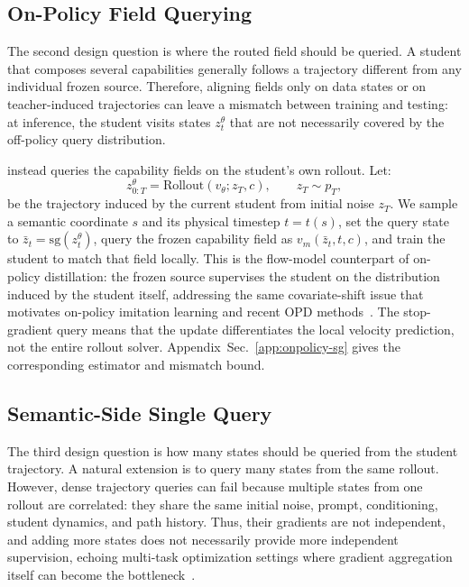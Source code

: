 \subsection{On-Policy Field Querying}
\label{sec:onpolicy-query}

The second design question is where the routed field should be queried. A student that composes several capabilities generally follows a trajectory different from any individual frozen source. Therefore, aligning fields only on data states or on teacher-induced trajectories can leave a mismatch between training and testing: at inference, the student visits states $z_t^\theta$ that are not necessarily covered by the off-policy query distribution.

\name{} instead queries the capability fields on the student's own rollout. Let:
\begin{equation}
  z_{0:T}^{\theta}=\mathrm{Rollout}(v_\theta; z_T,c), \qquad z_T\sim p_T,
  \label{eq:student-rollout}
\end{equation}
be the trajectory induced by the current student from initial noise $z_T$. We sample a semantic coordinate $s$ and its physical timestep $t=t(s)$, set the query state to $\bar z_t=\mathrm{sg}(z_t^\theta)$, query the frozen capability field as $v_m(\bar z_t,t,c)$, and train the student to match that field locally. This is the flow-model counterpart of on-policy distillation: the frozen source supervises the student on the distribution induced by the student itself, addressing the same covariate-shift issue that motivates on-policy imitation learning and recent OPD methods~\cite{ross2011reduction,agarwal2024policy,li2026diffusionopd,fang2026flow}. The stop-gradient query means that the update differentiates the local velocity prediction, not the entire rollout solver. Appendix~Sec.~\ref{app:onpolicy-sg} gives the corresponding estimator and mismatch bound.

\subsection{Semantic-Side Single Query}
\label{sec:query-design}

The third design question is how many states should be queried from the student trajectory. A natural extension is to query many states from the same rollout. However, dense trajectory queries can fail because multiple states from one rollout are correlated: they share the same initial noise, prompt, conditioning, student dynamics, and path history. Thus, their gradients are not independent, and adding more states does not necessarily provide more independent supervision, echoing multi-task optimization settings where gradient aggregation itself can become the bottleneck~\cite{chen2020just,liu2021towards,navon2022multi}.

